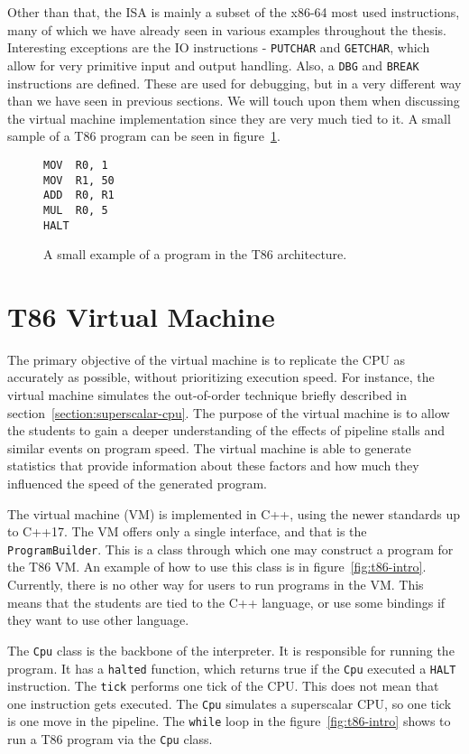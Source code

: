 Other than that, the ISA is mainly a subset of the x86-64 most used
instructions, many of which we have already seen in various examples throughout
the thesis. Interesting exceptions are the IO instructions - \texttt{PUTCHAR}
and \texttt{GETCHAR}, which allow for very primitive input and output handling.
Also, a \texttt{DBG} and \texttt{BREAK} instructions are defined. These are
used for debugging, but in a very different way than we have seen in previous
sections. We will touch upon them when discussing the virtual machine
implementation since they are very much tied to it. A small sample of a T86
program can be seen in figure~\ref{fig:t86-example}.

\begin{figure}
    \begin{lstlisting}
MOV  R0, 1
MOV  R1, 50
ADD  R0, R1
MUL  R0, 5
HALT
    \end{lstlisting}
    \caption{A small example of a program in the T86 architecture.}
    \label{fig:t86-example}
\end{figure}

\section{T86 Virtual Machine}\label{section:t86-vm}
The primary objective of the virtual machine is to replicate the CPU as
accurately as possible, without prioritizing execution speed. For instance, the
virtual machine simulates the out-of-order technique briefly described in
section~\ref{section:superscalar-cpu}. The purpose of the virtual machine is to
allow the students to gain a deeper understanding of the effects of pipeline
stalls and similar events on program speed. The virtual machine is able to
generate statistics that provide information about these factors and how
much they influenced the speed of the generated program.

The virtual machine (VM) is implemented in C++, using the newer standards up to
C++17. The VM offers only a single interface, and that is the
\texttt{ProgramBuilder}. This is a class through which one may construct a
program for the T86 VM. An example of how to use this class is in
figure~\ref{fig:t86-intro}. Currently, there is no other way for users to run
programs in the VM. This means that the students are tied to the C++ language,
or use some bindings if they want to use other language.

The \texttt{Cpu} class is the backbone of the interpreter. It is responsible
for running the program. It has a \texttt{halted} function, which returns true
if the \texttt{Cpu} executed a \texttt{HALT} instruction. The \texttt{tick}
performs one tick of the CPU. This does not mean that one instruction gets
executed. The \texttt{Cpu} simulates a superscalar CPU, so one tick is one move
in the pipeline. The \texttt{while} loop in the figure~\ref{fig:t86-intro}
shows to run a T86 program via the \texttt{Cpu} class.

